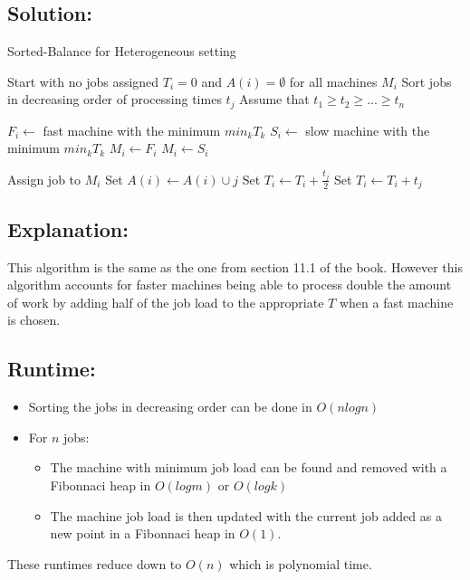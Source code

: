 \documentclass[11pt]{article}
\begin{document}
\subsection*{Solution:}
\begin{algorithm}
    \caption{Sorted-Balance for Heterogeneous setting}
    \begin{algorithmic}[1]
        \STATE Start with no jobs assigned
        \STATE $T_i = 0$ and $A(i)=\emptyset$ for all machines $M_i$
        \STATE Sort jobs in decreasing order of processing times $t_j$
        \STATE Assume that $t_1 \geq t_2 \geq ... \geq t_n$

            \STATE $F_i \gets $ fast machine with the minimum $min_k T_k$
            \STATE $S_i \gets $ slow machine with the minimum $min_k T_k$
                \STATE $M_i \gets F_i$
            \ELSE
                \STATE $M_i \gets S_i$
            \ENDIF

            \STATE Assign job to $M_i$
            \STATE Set $A(i) \gets A(i) \cup {j}$
                \STATE Set $T_i \gets T_i + \frac{t_j}{2}$
            \ELSE
                \STATE Set $T_i \gets T_i + t_j$
            \ENDIF
        \ENDFOR
    \end{algorithmic}
\end{algorithm}

\subsection*{Explanation:}
This algorithm is the same as the one from section 11.1 of the book.
However this algorithm accounts for faster machines being able to process double the amount of work
by adding half of the job load to the appropriate $T$ when a fast machine is chosen.

\subsection*{Runtime:}
\begin{itemize}
\itemsep0em
\item Sorting the jobs in decreasing order can be done in $O(nlogn)$
\item For $n$ jobs:\\
    \begin{itemize}
        \itemsep0em 
        \vspace{-0.6cm} \item The machine with minimum job load can be found and removed with a Fibonnaci heap in $O(logm)$ or $O(logk)$
        \item The machine job load is then updated with the current job added as a new point in a Fibonnaci heap in $O(1)$.
    \end{itemize}
\end{itemize}
These runtimes reduce down to $O(n)$ which is polynomial time.
\end{document}
